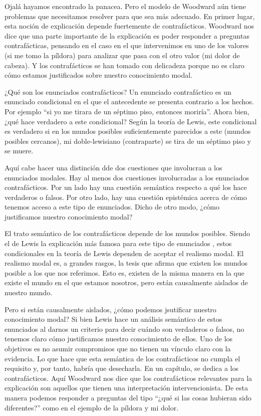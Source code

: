 Ojalá hayamos encontrado la panacea. Pero el modelo de Woodward aún tiene problemas que necesitamos resolver para que sea más adecuado. En primer lugar, esta noción de explicación depende fuertemente de contrafácticos. Woodward nos dice que una parte importante de la explicación es poder responder a preguntas contrafácticas, pensando en el caso en el que intervenimos en uno de los valores (si me tomo la píldora) para analizar que pasa con el otro valor (mi dolor de cabeza). Y los contrafácticos se han tomado con delicadeza porque no es claro cómo estamos justificados sobre nuestro conocimiento modal.

¿Qué son los enunciados contrafácticos? Un enunciado contrafáctico es un enunciado condicional en el que el antecedente se presenta contrario a los hechos. Por ejemplo ``si yo me tirara de un séptimo piso, entonces moriría''. Ahora bien, ¿qué hace verdadero a este condicional? Según la teoría de Lewis, este condicional es verdadero si en los mundos posibles suficientemente parecidos a este (mundos posibles cercanos), mi doble-lewisiano (contraparte) se tira de un séptimo piso y se muere.

Aquí cabe hacer una distinción dde dos cuestiones que involucran a los enunciados modales. Hay al menos dos cuestiones involucradas a los enunciados contrafácticos. Por un lado hay una cuestión semántica respecto a qué los hace verdaderos o falsos. Por otro lado, hay una cuestión epistémica acerca de cómo tenemos acceso a este tipo de enunciados. Dicho de otro modo, ¿cómo justificamos nuestro conocimiento modal?

El trato semántico de los contrafácticos depende de los mundos posibles. Siendo el de Lewis la explicación más famosa para este tipo de enunciados \citeyear{Lewis1973}, estos condicionales en la teoría de Lewis dependen de aceptar el realismo modal. El realismo modal es, a grandes rasgos, la tesis que afirma que existen los mundos posible a los que nos referimos. Esto es, existen de la misma manera en la que existe el mundo en el que estamos nosotros, pero están causalmente aislados de nuestro mundo.

Pero si están causalmente aislados, ¿cómo podemos jsutificar nuestro conocimiento modal? Si bien Lewis hace un análisis semántico de estos enunciados al darnos un criterio para decir cuándo son verdaderos o falsos, no tenemos claro cómo justificamos nuestro conocimiento de ellos. Uno de los objetivos es no asumir compromisos que no tienen un vínculo claro con la evidencia. Lo que hace que esta semántica de los contrafácticos no cumpla el requisito y, por tanto, habría que desecharla. En un capítulo, \cite[cap. 5]{Woodward2003} se dedica a los contrafácticos. Aquí Woodward nos dice que los contrafácticos relevantes para la explicación son aquellos que tienen una interpretación intervencionista. De esta manera podemos responder a preguntas del tipo ``¿qué si las cosas hubieran sido diferentes?'' como en el ejemplo de la píldora y mi dolor.

